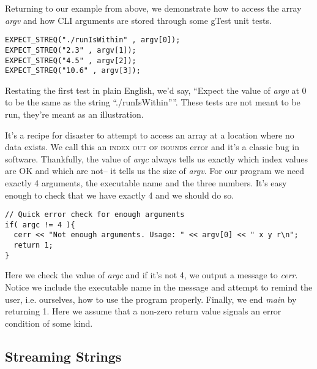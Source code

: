 \documentclass[]{tufte-handout}
\begin{document}
Returning to our example from above, we demonstrate how to access the array \textit{argv} and how CLI arguments are stored through some gTest unit tests.
\begin{verbatim}
EXPECT_STREQ("./runIsWithin" , argv[0]);
EXPECT_STREQ("2.3" , argv[1]);
EXPECT_STREQ("4.5" , argv[2]);
EXPECT_STREQ("10.6" , argv[3]);
\end{verbatim}
Restating the first test in plain English, we'd say, ``Expect the value of \textit{argv} at 0 to be the same as the string ``./runIsWithin''''. These tests are not meant to be run, they're meant as an illustration. 

It's a recipe for disaster to attempt to access an array at a location where no data exists. We call this an \textsc{index out of bounds} error and it's a classic bug in software.  Thankfully, the value of \textit{argc} always tells us exactly which index values are OK and which are not-- it tells us the size of \textit{argv}. For our program we need exactly 4 arguments, the executable name and the three numbers. It's easy enough to check that we have exactly 4 and we should do so.
\begin{verbatim}
// Quick error check for enough arguments
if( argc != 4 ){
  cerr << "Not enough arguments. Usage: " << argv[0] << " x y r\n";
  return 1;
}
\end{verbatim}
Here we check the value of \textit{argc} and if it's not 4, we output a message to \textit{cerr}. Notice we include the executable name in the message and attempt to remind the user, i.e. ourselves, how to use the program properly. Finally, we end \textit{main} by returning 1. Here we assume that a non-zero return value signals an error condition of some kind.

\subsection{Streaming Strings}
\end{document}
